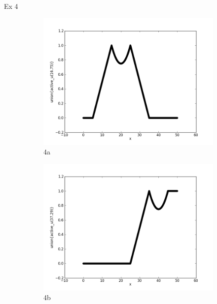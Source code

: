 \documentclass{report}
\begin{document}
Ex 4
\begin{figure}[ht]
        \begin{subfigure}[b]{0.5\textwidth}
                \centering
                \includegraphics[width=\textwidth]{ex4a.png}
                \caption{4a}
        \end{subfigure}
	\begin{subfigure}[b]{0.5\textwidth}
                \centering
                \includegraphics[width=\textwidth]{ex4b.png}
                \caption{4b}
	\end{subfigure}
	\begin{subfigure}[b]{0.5\textwidth}
                \centering

\end{subfigure}
\end{figure}
\end{document}
